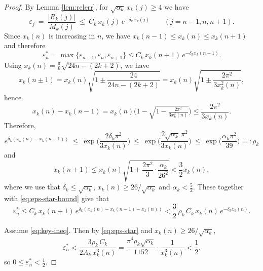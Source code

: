 \documentclass[10pt,a4paper]{amsart}
\begin{document}
\begin{proof}
By Lemma \ref{lem:relerr}, for $\sqrt{\alpha_k}\,x_k(j)\ge 4$ we have
\begin{equation*}
\varepsilon_j\ =\ \frac{|R_k(j)|}{M_k(j)}\ \le\ C_k\,x_k(j)\,e^{-\delta_k\,x_k(j)}\qquad(j=n-1,n,n+1).
\end{equation*}
Since $x_k(n)$ is increasing in $n$, we have $x_k(n-1)\le x_k(n)\le x_k(n+1)$ and therefore
\begin{equation}\label{eq:eps-star-bound}
\varepsilon_n^\ast=\max\{\varepsilon_{n-1},\varepsilon_n,\varepsilon_{n+1}\}
\le C_k\, x_k(n+1)\, e^{-\delta_k x_k(n-1)}.
\end{equation}
Using $x_k(n)=\frac{\pi}{6}\sqrt{24n-(2k+2)}$, we have
\[
x_k(n\pm1)=x_k(n)\sqrt{1\pm\frac{24}{24n-(2k+2)}}=x_k(n)\sqrt{1\pm\frac{2\pi^2}
{3x_k^2(n)}},
\]
hence
\[
x_k(n)-x_k(n-1)=x_k(n)\Big(1-\sqrt{1-\tfrac{2\pi^2}{3x_k^2(n)}}\Big)\le \frac{2\pi^2}{3x_k(n)}.
\]
Therefore,
\[
e^{\delta_k(x_k(n)-x_k(n-1))}\ \le\ \exp\!\Big(\frac{2\delta_k\pi^2}{3x_k(n)}\Big)
\ \le\ \exp\!\Big(\frac{2\sqrt{\alpha_k}\,\pi^2}{3x_k(n)}\Big)
\ \le\ \exp\!\Big(\frac{\alpha_k\pi^2}{39}\Big)=:\rho_k
\]
and
\[x_k(n+1)\le x_k(n)\sqrt{1+\frac{2\pi^2}
{3}\cdot \frac{\alpha_k}{26^2}}< \frac{3}{2}x_k(n), \]
where we use that $\delta_k\le \sqrt{\alpha_k}$, $x_k(n)\ge 26/\sqrt{\alpha_k}$ and $\alpha_k<\frac{5}{2}$. These together with \eqref{eq:eps-star-bound} give that
\begin{equation}\label{eq:eps-star}
\varepsilon_n^\ast\le C_k\, x_k(n+1)\, e^{\delta_k (x_k(n)-x_k(n-1)-x_k(n))} < \frac{3}{2}\,\rho_k\,C_k\, x_k(n)\, e^{-\delta_k x_k(n)}.
\end{equation}

Assume \eqref{eq:key-ineq}. Then by \eqref{eq:eps-star} and $x_k(n)\ge 26/\sqrt{\alpha_k}$,
\[
\varepsilon_n^\ast < \frac{3\rho_k\,C_k}{2A_k\,x_k^3(n)}
=\frac{\pi^4\rho_k\sqrt{\alpha_k}}{1152}\cdot\frac{1}{x_k^3(n)}< \frac12.
\]
so \(0\le\varepsilon_n^\ast<\tfrac12\).


\end{proof}
\end{document}
